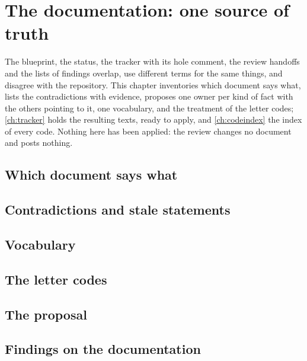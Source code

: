 \chapter{The documentation: one source of truth}\label{ch:documentation}

The blueprint, the status, the tracker with its hole comment, the review handoffs and the
lists of findings overlap, use different terms for the same things, and disagree with the
repository. This chapter inventories which document says what, lists the contradictions with
evidence, proposes one owner per kind of fact with the others pointing to it, one vocabulary,
and the treatment of the letter codes; \cref{ch:tracker} holds the resulting texts, ready to
apply, and \cref{ch:codeindex} the index of every code. Nothing here has been applied: the
review changes no document and posts nothing.

\section{Which document says what}

\section{Contradictions and stale statements}

\section{Vocabulary}

\section{The letter codes}

\section{The proposal}\label{sec:docs-proposal}

\section{Findings on the documentation}
